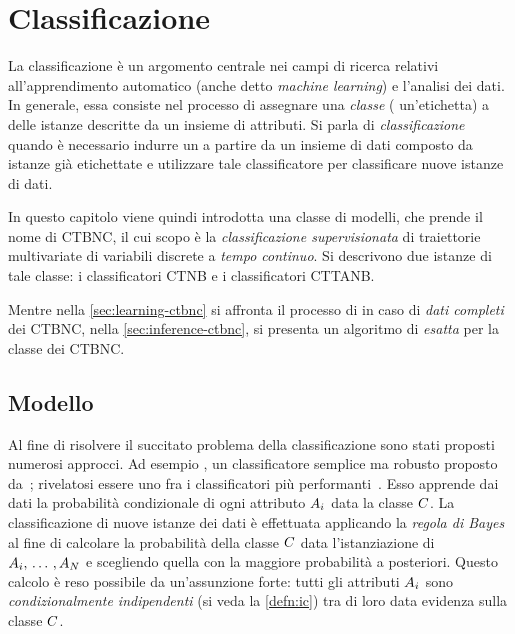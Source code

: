 
\chapter{Classificazione}
\label{cap:ctbnc}
La classificazione è un argomento centrale nei campi di ricerca relativi all'apprendimento automatico (anche detto \emph{machine learning}) e l'analisi dei dati. In generale, essa consiste nel processo di assegnare una \emph{classe} (\ie{} un'etichetta) a delle istanze descritte da un insieme di attributi. Si parla di \emph{classificazione } quando è necessario indurre un  a partire da un insieme di dati composto da istanze già etichettate e utilizzare tale classificatore per classificare nuove istanze di dati.

In questo capitolo viene quindi introdotta una classe di modelli, che prende il nome di \acf{CTBNC}, il cui scopo è la \emph{classificazione supervisionata} di traiettorie multivariate di variabili discrete a \emph{tempo continuo}. Si descrivono due istanze di tale classe: i classificatori \acf{CTNB} e i classificatori \acf{CTTANB}.

Mentre nella \autoref{sec:learning-ctbnc} si affronta il processo di \emph{} in caso di \emph{dati completi} dei \acs{CTBNC}, nella \autoref{sec:inference-ctbnc}, si presenta un algoritmo di \emph{ esatta} per la classe dei \acs{CTBNC}.

\section{Modello}\label{sec:ctbnc-model}
Al fine di risolvere il succitato problema della classificazione sono stati proposti numerosi approcci. Ad esempio \lwcase \nb{} \class{}, un classificatore semplice ma robusto proposto da~\citet{DudaHart1973}; rivelatosi essere uno fra i classificatori più performanti~\citep{Langley1992}. Esso apprende dai dati la probabilità condizionale di ogni attributo $\mathnormal{A}_i$ data la classe $\mathnormal{C}$. La classificazione di nuove istanze dei dati è effettuata applicando la \emph{regola di Bayes} al fine di calcolare la probabilità della classe $\mathnormal{C}$ data l'istanziazione di $\mathnormal{A}_i,\,\dotsc\,,\mathnormal{A}_N$ e scegliendo quella con la maggiore probabilità a posteriori. Questo calcolo è reso possibile da un'assunzione forte: tutti gli attributi $\mathnormal{A}_i$ sono \emph{condizionalmente indipendenti} (si veda la \autoref{defn:ic}) tra di loro data evidenza sulla classe $\mathnormal{C}$.

